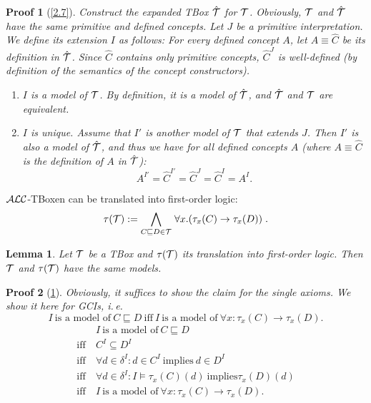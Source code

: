 \documentclass[openany]{scrbook}
\theoremstyle{break}
\newtheorem{Lemma}[Theorem]{Lemma}
\theoremstyle{nonumberbreak}
\theoremstyle{nonumberplain}
\theoremstyle{nonumberbreak}
\newtheorem{Proof}{Proof}
\newcommand{\ie}{i{.}\,e{.}\xspace}
\newcommand{\ALC}{{\cal A}{\cal L}{\cal C}}
\begin{document}
\begin{Proof}[\cref{2.7}]
  Construct the expanded TBox $\hat{\cal T}$ for ${\cal
    T}$. Obviously, ${\cal T}$ and $\hat{\cal T}$ have the same
  primitive and defined concepts. Let $J$ be a primitive
  interpretation. We define its extension $I$ as follows:
  For every defined concept $A$, let $A \equiv \hat{C}$ be its
  definition in $\hat{\cal T}$. Since $\hat{C}$ contains only
  primitive concepts, $\hat{C}^J$ is well-defined (by definition of
  the semantics of the concept constructors).
  \begin{enumerate}
  \item $I$ is a model of ${\cal T}$. By definition, it is a model of
    $\hat{{\cal T}}$, and $\hat{{\cal T}}$ and ${\cal T}$ are
    equivalent.
  \item $I$ is unique. Assume that $I'$ is another model of ${\cal T}$
    that extends $J$. Then $I'$ is also a model of $\hat{\cal T}$, and
    thus we have for all defined concepts $A$ (where $A \equiv
    \hat{C}$ is the definition of $A$ in $\hat{\cal T}$):
    \begin{equation*}
      A^{I'} = \hat{C}^{I'} = \hat{C}^J = \hat{C}^I = A^I.
    \end{equation*}
  \end{enumerate}
\end{Proof}

$\ALC$-TBoxen can be translated into first-order logic:
\begin{equation*}
  \tau({\cal T}) := \bigwedge_{C \sqsubseteq D \in {\cal T}} \left.\forall
  x.(\tau_x(C) \to \tau_x(D))\right..
\end{equation*}

\begin{Lemma}
  \label{2.8}
  Let ${\cal T}$ be a TBox and $\tau({\cal T})$ its translation into
  first-order logic. Then ${\cal T}$ and $\tau({\cal T})$ have the
  same models.
\end{Lemma}

\begin{Proof}[\cref{2.8}]
  Obviously, it suffices to show the claim for the single axioms. We
  show it here for GCIs, \ie
  \begin{equation*}
    I\ \text{is a model of}\ C \sqsubseteq D\ \text{iff}\ I\ \text{is
      a model of}\ \forall x: \tau_x(C) \to \tau_x(D).
  \end{equation*}
  \begin{align*}
    & I\ \text{is a model of}\ C \sqsubseteq D \\
    \text{iff}\ & C^I \subseteq D^I \\
    \text{iff}\ & \forall d \in \delta^I: d \in C^I\ \text{implies}\ d
    \in D^I \\
    \text{iff}\ & \forall d \in \delta^I: I \models \tau_x(C)(d)\
    \text{implies} \tau_x(D)(d) \\
    \text{iff}\ & I\ \text{is a model of}\ \forall x: \tau_x(C) \to
    \tau_x(D).
  \end{align*}
\end{Proof}
\end{document}
